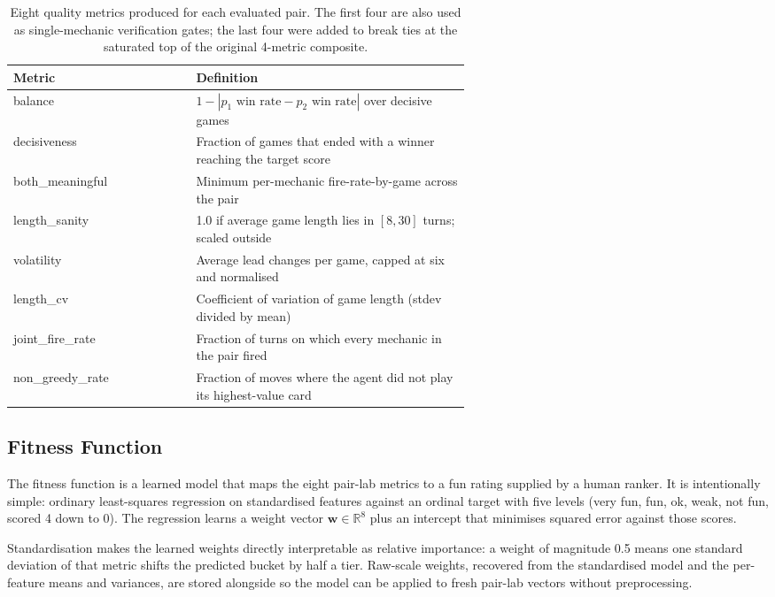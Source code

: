 \documentclass[conference]{IEEEtran}
\begin{document}
\begin{table}[ht!]
\centering
\caption{Eight quality metrics produced for each evaluated pair. The first four are also used as single-mechanic verification gates; the last four were added to break ties at the saturated top of the original 4-metric composite.}
\label{tab:metrics}
\begin{tabular}{|l|p{0.6\linewidth}|}
\hline
\textbf{Metric} & \textbf{Definition} \\
\hline
balance & $1 - |p_1\text{ win rate} - p_2\text{ win rate}|$ over decisive games \\
\hline
decisiveness & Fraction of games that ended with a winner reaching the target score \\
\hline
both\_meaningful & Minimum per-mechanic fire-rate-by-game across the pair \\
\hline
length\_sanity & 1.0 if average game length lies in $[8, 30]$ turns; scaled outside \\
\hline
volatility & Average lead changes per game, capped at six and normalised \\
\hline
length\_cv & Coefficient of variation of game length (stdev divided by mean) \\
\hline
joint\_fire\_rate & Fraction of turns on which every mechanic in the pair fired \\
\hline
non\_greedy\_rate & Fraction of moves where the agent did not play its highest-value card \\
\hline
\end{tabular}
\end{table}

\subsection{Fitness Function}

The fitness function is a learned model that maps the eight pair-lab metrics to a fun rating supplied by a human ranker. It is intentionally simple: ordinary least-squares regression on standardised features against an ordinal target with five levels (very fun, fun, ok, weak, not fun, scored 4 down to 0). The regression learns a weight vector $\mathbf{w} \in \mathbb{R}^8$ plus an intercept that minimises squared error against those scores.

Standardisation makes the learned weights directly interpretable as relative importance: a weight of magnitude 0.5 means one standard deviation of that metric shifts the predicted bucket by half a tier. Raw-scale weights, recovered from the standardised model and the per-feature means and variances, are stored alongside so the model can be applied to fresh pair-lab vectors without preprocessing.
\end{document}
